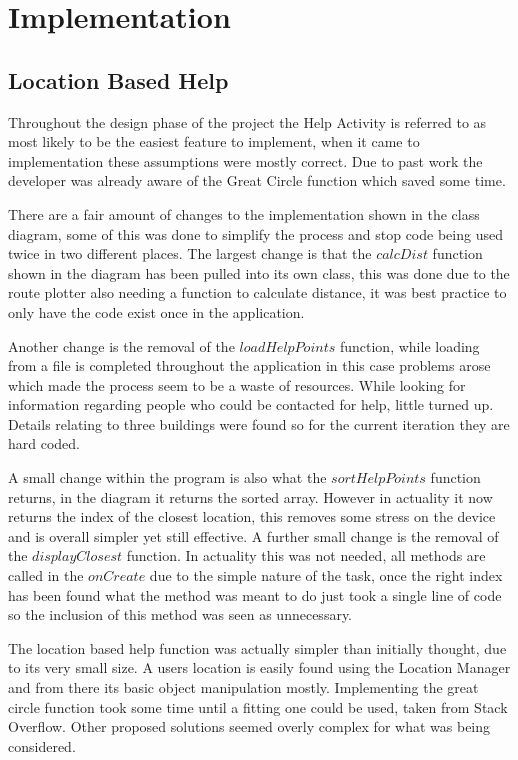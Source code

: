 \chapter{Implementation}

\section{Location Based Help}
Throughout the design phase of the project the Help Activity is referred to as most likely to be the easiest feature to implement, when it came to implementation these assumptions were mostly correct.  Due to past work the developer was already aware of the Great Circle function\cite{circle} which saved some time.

There are a fair amount of changes to the implementation shown in the class diagram, some of this was done to simplify the process and stop code being used twice in two different places. The largest change is that the $calcDist$ function shown in the diagram has been pulled into its own class, this was done due to the route plotter also needing a function to calculate distance, it was best practice to only have the code exist once in the application.

Another change is the removal of the $loadHelpPoints$ function, while loading from a file is completed throughout the application in this case problems arose which made the process seem to be a waste of resources. While looking for information regarding people who could be contacted for help, little turned up. Details relating to three buildings were found so for the current iteration they are hard coded. 

A small change within the program is also what the $sortHelpPoints$ function returns, in the diagram it returns the sorted array. However in actuality it now returns the index of the closest location, this removes some stress on the device and is overall simpler yet still effective. A further small change is the removal of the $displayClosest$ function. In actuality this was not needed, all methods are called in the $onCreate$ due to the simple nature of the task, once the right index has been found what the method was meant to do just took a single line of code so the inclusion of this method was seen as unnecessary.

The location based help function was actually simpler than initially thought, due to its very small size. A users location is easily found using the Location Manager and from there its basic object manipulation mostly. Implementing the great circle function took some time until a fitting one could be used, taken from Stack Overflow\cite{circlef}. Other proposed solutions seemed overly complex for what was being considered.

